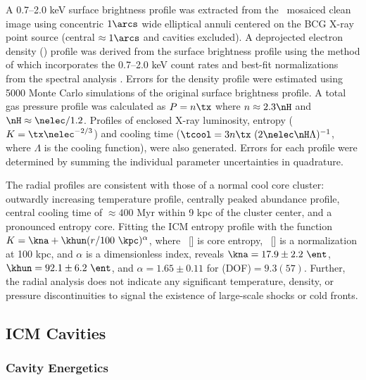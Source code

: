 \documentclass[11pt, preprint]{aastex}
\begin{document}
A 0.7--2.0 keV surface brightness profile was extracted from the
\cxo\ mosaiced clean image using concentric $1\arcs$ wide elliptical
annuli centered on the BCG X-ray point source (central $\approx
1\arcs$ and cavities excluded). A deprojected electron density
(\nelec) profile was derived from the surface brightness profile using
the method of \citet{kriss83} which incorporates the 0.7--2.0 keV
count rates and best-fit normalizations from the spectral analysis
\citep[see][for details]{accept}. Errors for the density profile were
estimated using 5000 Monte Carlo simulations of the original surface
brightness profile. A total gas pressure profile was calculated as $P
= n \tx$ where $n \approx 2.3 \nH$ and $\nH \approx
\nelec/1.2$. Profiles of enclosed X-ray luminosity, entropy ($K = \tx
\nelec^{-2/3}$) and cooling time ($\tcool = 3 n \tx~(2 \nelec \nH
\Lambda)^{-1}$, where $\Lambda$ is the cooling function), were also
generated. Errors for each profile were determined by summing the
individual parameter uncertainties in quadrature.

The radial profiles are consistent with those of a normal cool core
cluster: outwardly increasing temperature profile, centrally peaked
abundance profile, central cooling time of $\approx 400$ Myr within 9
kpc of the cluster center, and a pronounced entropy core. Fitting the
ICM entropy profile with the function $K = \kna +\khun (r/100
~\kpc)^{\alpha}$, where \kna\ [\ent] is core entropy, \khun\ [\ent] is
a normalization at 100 kpc, and $\alpha$ is a dimensionless index,
reveals $\kna = 17.9 \pm 2.2 ~\ent$, $\khun = 92.1 \pm 6.2 ~\ent$, and
$\alpha = 1.65 \pm 0.11$ for \chisq(DOF)$ = 9.3(57)$. Further, the
radial analysis does not indicate any significant temperature,
density, or pressure discontinuities to signal the existence of
large-scale shocks or cold fronts.

\subsection{ICM Cavities}
\label{sec:cavities}

\subsubsection{Cavity Energetics}
\label{sec:ecav}
\end{document}
